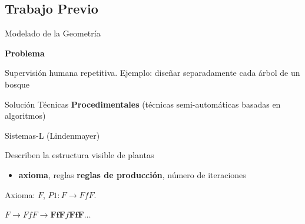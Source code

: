 \documentclass[spanish,unknownkeysallowed]{beamer}
\begin{document}
\subsection{Trabajo Previo}

\begin{frame}{Modelado de la Geometría}

\textbf{Problema}

Supervisión humana repetitiva. Ejemplo: diseñar separadamente cada árbol de un bosque

\begin{block}{Solución}
Técnicas \textbf{Procedimentales} (técnicas semi-automáticas basadas en algoritmos)
\end{block}

\begin{block}{Sistemas-L (Lindenmayer)}

Describen la estructura visible de plantas


\begin{itemize}
\item \textbf{axioma}, reglas \textbf{reglas de producción}, número de iteraciones
\end{itemize}
\end{block}


Axioma: $F$, $P1: F \rightarrow FfF$.

$F \rightarrow FfF \rightarrow \textbf{FfF}f\textbf{FfF} \ldots$

\end{frame}
\end{document}
